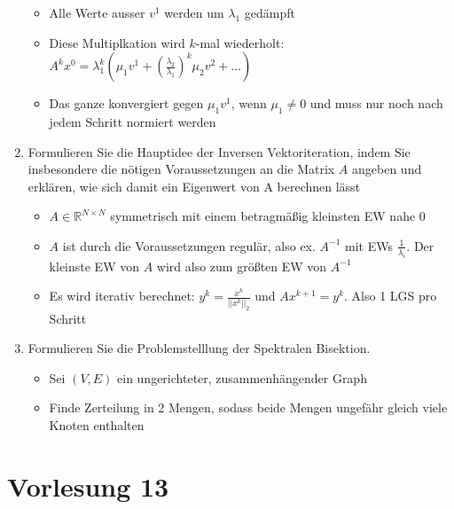 \documentclass[]{article}
\newcommand*{\real}{\ensuremath{\mathbb{R}}}
\begin{document}
\begin{enumerate}
\begin{itemize}
				\item Alle Werte ausser $v^1$ werden um $\lambda_1$ gedämpft
				\item Diese Multiplkation wird $k$-mal wiederholt: $A^kx^0 = \lambda_1^k ( \mu_1v^1 + (\frac{\lambda_2}{\lambda_1})^k \mu_2v^2 + \dots)$
				\item Das ganze konvergiert gegen $\mu_1v^1$, wenn $\mu_1 \neq 0$ und muss nur noch nach jedem Schritt normiert werden
			\end{itemize}
		\item Formulieren Sie die Hauptidee der Inversen Vektoriteration, indem Sie insbesondere die nötigen Voraussetzungen an die Matrix $A$ angeben und erklären, wie sich damit ein Eigenwert von A berechnen lässt
			\begin{itemize}
				\item $A \in \real^{N \times N}$ symmetrisch mit einem betragmäßig kleinsten EW nahe $0$
				\item $A$ ist durch die Voraussetzungen regulär, also ex. $A^{-1}$ mit EWs $\frac{1}{\lambda_i}$. Der kleinste EW von $A$ wird also zum größten EW von $A^{-1}$
				\item Es wird iterativ berechnet: $y^k = \frac{x^k}{||x^k||_2}$ und $Ax^{k+1} = y^k$. Also 1 LGS pro Schritt
			\end{itemize}
		\item Formulieren Sie die Problemstelllung der Spektralen Bisektion.
			\begin{itemize}
				\item Sei $(V,E)$ ein ungerichteter, zusammenhängender Graph
				\item Finde Zerteilung in 2 Mengen, sodass beide Mengen ungefähr gleich viele Knoten enthalten
			\end{itemize}
	\end{enumerate}

\section{Vorlesung 13}
\end{document}
